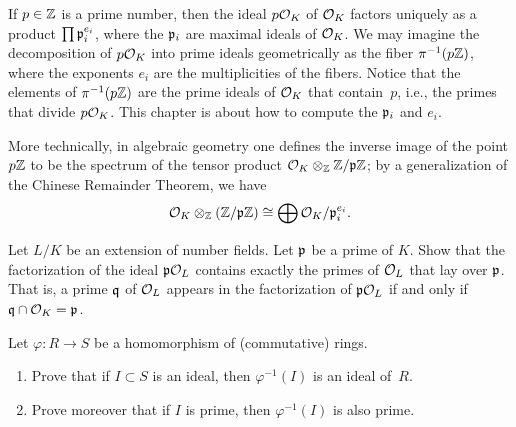 If $p\in\mathbb{Z}$ is a prime number, then the ideal $p\mathcal{O}_K$ of $\mathcal{O}_K$
factors uniquely as a product $\prod \mathfrak{p}_i^{e_i}$, where the $\mathfrak{p}_i$ are
maximal ideals of $\mathcal{O}_K$.  We may imagine the decomposition of $p\mathcal{O}_K$
into prime ideals geometrically as the fiber $\pi^{-1}(p\mathbb{Z})$, where
the exponents $e_i$ are the multiplicities of the fibers.  Notice that
the elements of $\pi^{-1}(p\mathbb{Z})$ are the prime ideals of $\mathcal{O}_K$ that
contain~$p$, i.e., the primes that divide $p\mathcal{O}_K$.
This chapter is about how to compute the $\mathfrak{p}_i$ and $e_i$.

\begin{remark}
  More technically, in algebraic geometry one defines the inverse
  image of the point $p\mathbb{Z}$ to be the spectrum of the tensor product
  $\mathcal{O}_K \otimes_{\mathbb{Z}} \mathbb{Z}/\mathfrak{p}\mathbb{Z}$; by a generalization of the Chinese
  Remainder Theorem, we have
  $$
    \mathcal{O}_K \otimes_{\mathbb{Z}} \left(\mathbb{Z}/\mathfrak{p}\mathbb{Z}\right) \cong \bigoplus \mathcal{O}_K/\mathfrak{p}_i^{e_i}.
  $$
\end{remark}

\begin{exercise}
  Let $L/K$ be an extension of number fields. Let $\mathfrak{p}$ be a prime of $K$.
  Show that the factorization of the ideal $\mathfrak{p}\mathcal{O}_L$ contains exactly the primes
  of $\mathcal{O}_L$ that lay over $\mathfrak{p}$. That is, a prime $\mathfrak{q}$ of $\mathcal{O}_L$ appears in
  the factorization of $\mathfrak{p}\mathcal{O}_L$ if and only if $\mathfrak{q} \cap \mathcal{O}_K = \mathfrak{p}$.
\end{exercise}

\begin{exercise}
  Let $\varphi: R \to S$ be a homomorphism of (commutative) rings.
  \begin{enumerate}[label=(\alph*)]
    \item Prove that if $I \subset S$ is an ideal, then $\varphi^{-1}(I)$
    is an ideal of~$R$.
    \item Prove moreover that if $I$ is prime, then $\varphi^{-1}(I)$ is
    also prime.
  \end{enumerate}
\end{exercise}

